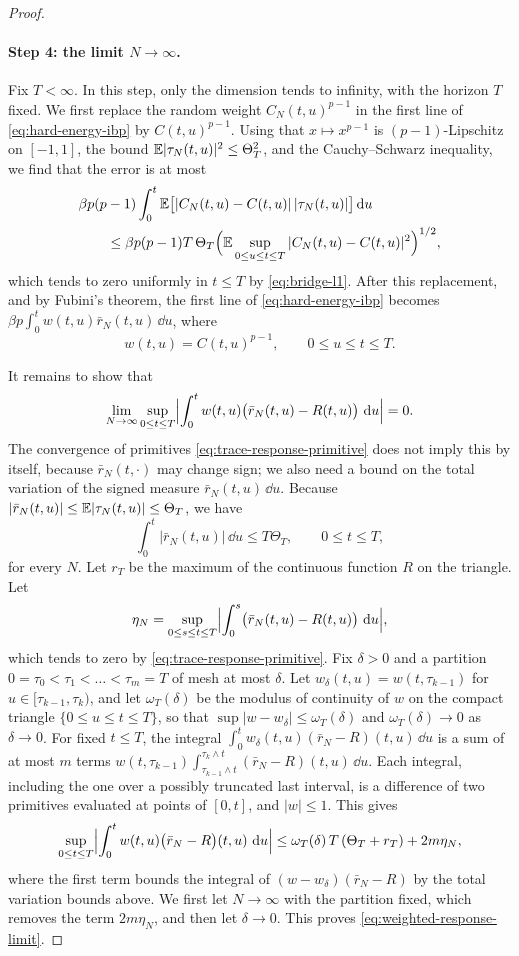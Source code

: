 \begin{proof}
\paragraph{Step 4: the limit $N\to\infty$.}
Fix $T<\infty$. In this step, only the dimension tends to infinity, with the horizon $T$ fixed. We first replace the random weight $C_N(t,u)^{p-1}$ in the first line of \eqref{eq:hard-energy-ibp} by $C(t,u)^{p-1}$. Using that $x\mapsto x^{p-1}$ is $(p-1)$-Lipschitz on $[-1,1]$, the bound $\mathbb E|\tau_N(t,u)|^2\le\Theta_T^2$, and the Cauchy--Schwarz inequality, we find that the error is at most
\[
\begin{aligned}
 &\beta p(p-1)\int_0^t\mathbb E\bigl[|C_N(t,u)-C(t,u)|\,|\tau_N(t,u)|\bigr]\mathop{}\!\mathrm d u\\
 &\qquad\le\beta p(p-1)T\,\Theta_T\Bigl(\mathbb E\sup_{0\le u\le t\le T}|C_N(t,u)-C(t,u)|^2\Bigr)^{1/2},
\end{aligned}
\]
which tends to zero uniformly in $t\le T$ by \eqref{eq:bridge-l1}. After this replacement, and by Fubini's theorem, the first line of \eqref{eq:hard-energy-ibp} becomes $\beta p\int_0^tw(t,u)\bar r_N(t,u)\,\dd u$, where
\[
 w(t,u)=C(t,u)^{p-1},\qquad 0\le u\le t\le T.
\]

It remains to show that
\begin{equation}\label{eq:weighted-response-limit}
 \lim_{N\to\infty}\sup_{0\le t\le T}\Bigl|\int_0^tw(t,u)\bigl(\bar r_N(t,u)-R(t,u)\bigr)\,\mathop{}\!\mathrm d u\Bigr|=0.
\end{equation}
The convergence of primitives \eqref{eq:trace-response-primitive} does not imply this by itself, because $\bar r_N(t,\cdot)$ may change sign; we also need a bound on the total variation of the signed measure $\bar r_N(t,u)\,\dd u$. Because $|\bar r_N(t,u)|\le\mathbb E|\tau_N(t,u)|\le\Theta_T$, we have
\[
 \int_0^t|\bar r_N(t,u)|\,\dd u\le T\Theta_T,\qquad 0\le t\le T,
\]
for every $N$. Let $r_T$ be the maximum of the continuous function $R$ on the triangle. Let
\[
 \eta_N=\sup_{0\le s\le t\le T}\Bigl|\int_0^s\bigl(\bar r_N(t,u)-R(t,u)\bigr)\,\mathop{}\!\mathrm d u\Bigr|,
\]
which tends to zero by \eqref{eq:trace-response-primitive}. Fix $\delta>0$ and a partition $0=\tau_0<\tau_1<\dots<\tau_m=T$ of mesh at most $\delta$. Let $w_\delta(t,u)=w(t,\tau_{k-1})$ for $u\in[\tau_{k-1},\tau_k)$, and let $\omega_T(\delta)$ be the modulus of continuity of $w$ on the compact triangle $\{0\le u\le t\le T\}$, so that $\sup|w-w_\delta|\le\omega_T(\delta)$ and $\omega_T(\delta)\to0$ as $\delta\to0$. For fixed $t\le T$, the integral $\int_0^tw_\delta(t,u)(\bar r_N-R)(t,u)\,\dd u$ is a sum of at most $m$ terms $w(t,\tau_{k-1})\int_{\tau_{k-1}\wedge t}^{\tau_k\wedge t}(\bar r_N-R)(t,u)\,\dd u$. Each integral, including the one over a possibly truncated last interval, is a difference of two primitives evaluated at points of $[0,t]$, and $|w|\le1$. This gives
\[
 \sup_{0\le t\le T}\Bigl|\int_0^tw(t,u)\bigl(\bar r_N-R\bigr)(t,u)\,\mathop{}\!\mathrm d u\Bigr|
 \le\omega_T(\delta)\,T\,(\Theta_T+r_T)+2m\eta_N,
\]
where the first term bounds the integral of $(w-w_\delta)(\bar r_N-R)$ by the total variation bounds above. We first let $N\to\infty$ with the partition fixed, which removes the term $2m\eta_N$, and then let $\delta\to0$. This proves \eqref{eq:weighted-response-limit}.


\end{proof}
